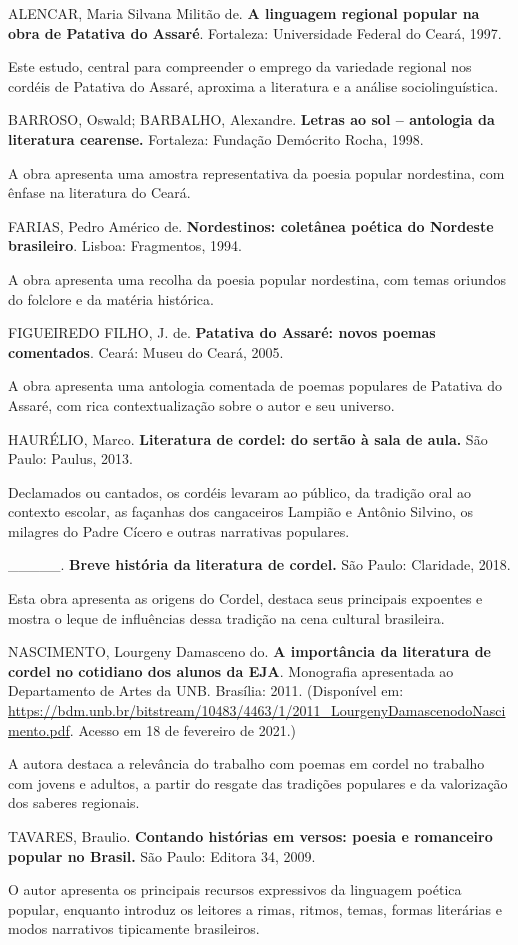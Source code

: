 \documentclass[12pt]{extarticle}
\begin{document}
  ALENCAR, Maria Silvana Militão de. \textbf{A linguagem regional
  popular na obra de Patativa do Assaré}. Fortaleza: Universidade
  Federal do Ceará, 1997.

Este estudo, central para compreender o emprego da variedade regional
nos cordéis de Patativa do Assaré, aproxima a literatura e a análise
sociolinguística.


  BARROSO, Oswald; BARBALHO, Alexandre. \textbf{Letras ao sol --
  antologia da literatura cearense.} Fortaleza: Fundação Demócrito
  Rocha, 1998.

A obra apresenta uma amostra representativa da poesia popular
nordestina, com ênfase na literatura do Ceará.


  FARIAS, Pedro Américo de. \textbf{Nordestinos: coletânea poética do
  Nordeste brasileiro}. Lisboa: Fragmentos, 1994.

A obra apresenta uma recolha da poesia popular nordestina, com temas
oriundos do folclore e da matéria histórica.


  FIGUEIREDO FILHO, J. de. \textbf{Patativa do Assaré: novos poemas
  comentados}. Ceará: Museu do Ceará, 2005.

A obra apresenta uma antologia comentada de poemas populares de Patativa
do Assaré, com rica contextualização sobre o autor e seu universo.


  HAURÉLIO, Marco. \textbf{Literatura de cordel: do sertão à sala de
  aula.} São Paulo: Paulus, 2013.

Declamados ou cantados, os cordéis levaram ao público, da tradição oral
ao contexto escolar, as façanhas dos cangaceiros Lampião e Antônio
Silvino, os milagres do Padre Cícero e outras narrativas populares.


  \_\_\_\_\_. \textbf{Breve história da literatura de cordel.} São
  Paulo: Claridade, 2018.

Esta obra apresenta as origens do Cordel, destaca seus principais
expoentes e mostra o leque de influências dessa tradição na cena
cultural brasileira.


  NASCIMENTO, Lourgeny Damasceno do. \textbf{A importância da literatura
  de cordel no cotidiano dos alunos da EJA}. Monografia apresentada ao
  Departamento de Artes da UNB. Brasília: 2011. (Disponível em:
  \url{https://bdm.unb.br/bitstream/10483/4463/1/2011_LourgenyDamascenodoNascimento.pdf}.
  Acesso em 18 de fevereiro de 2021.)

A autora destaca a relevância do trabalho com poemas em cordel no
trabalho com jovens e adultos, a partir do resgate das tradições
populares e da valorização dos saberes regionais.


  TAVARES, Braulio. \textbf{Contando histórias em versos: poesia e
  romanceiro popular no Brasil.} São Paulo: Editora 34, 2009.

O autor apresenta os principais recursos expressivos da linguagem
poética popular, enquanto introduz os leitores a rimas, ritmos, temas,
formas literárias e modos narrativos tipicamente brasileiros.
\end{document}
